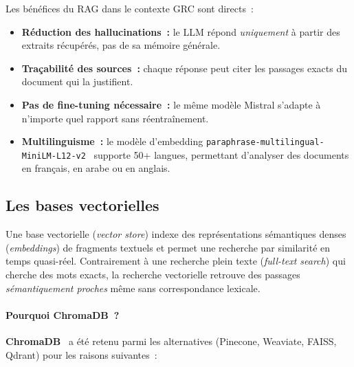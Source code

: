 \documentclass[a4paper,12pt,oneside]{report}
\begin{document}
	Les b\'en\'efices du RAG dans le contexte GRC sont directs~:
	
	\begin{itemize}[leftmargin=1.5em,itemsep=4pt]
		\item \textbf{R\'eduction des hallucinations~:} le LLM r\'epond \textit{uniquement}
		\`a partir des extraits r\'ecup\'er\'es, pas de sa m\'emoire g\'en\'erale.
		\item \textbf{Tra\c{c}abilit\'e des sources~:} chaque r\'eponse peut citer les
		passages exacts du document qui la justifient.
		\item \textbf{Pas de fine-tuning n\'ecessaire~:} le m\^eme mod\`ele Mistral
		s'adapte \`a n'importe quel rapport sans r\'eentra\^inement.
		\item \textbf{Multilinguisme~:} le mod\`ele d'embedding
		\texttt{paraphrase-multilingual-MiniLM-L12-v2}~\cite{sentence_transformers} supporte 50+ langues,
		permettant d'analyser des documents en fran\c{c}ais, en arabe ou en anglais.
	\end{itemize}
	
	\subsection{Les bases vectorielles}
	
	Une base vectorielle (\textit{vector store}) indexe des repr\'esentations
	s\'emantiques denses (\textit{embeddings}) de fragments textuels et permet
	une recherche par similarit\'e en temps quasi-r\'eel. Contrairement \`a une
	recherche plein texte (\textit{full-text search}) qui cherche des mots exacts,
	la recherche vectorielle retrouve des passages \textit{s\'emantiquement proches}
	m\^eme sans correspondance lexicale.
	
	\paragraph{Pourquoi ChromaDB~?}
	\textbf{ChromaDB}~\cite{chromadb} a \'et\'e retenu parmi les alternatives (Pinecone, Weaviate,
	FAISS, Qdrant) pour les raisons suivantes~:
	
\end{document}

